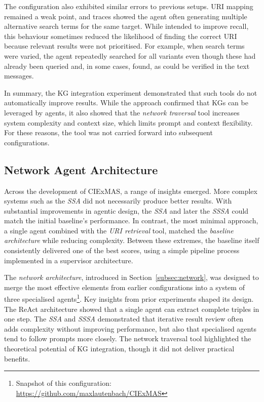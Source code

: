 \documentclass[a4paper,oneside,bibliography=totoc]{scrbook}
\begin{document}
The configuration also exhibited similar errors to previous setups. \ac{URI} mapping remained a weak point, and traces showed the agent often generating multiple alternative search terms for the same target. While intended to improve recall, this behaviour sometimes reduced the likelihood of finding the correct \ac{URI} because relevant results were not prioritised. For example, when search terms were varied, the agent repeatedly searched for all variants even though these had already been queried and, in some cases, found, as could be verified in the text messages.

In summary, the \ac{KG} integration experiment demonstrated that such tools do not automatically improve results. While the approach confirmed that \acp{KG} can be leveraged by agents, it also showed that the \textit{network traversal} tool increases system complexity and context size, which limits prompt and context flexibility. For these reasons, the tool was not carried forward into subsequent configurations.

\subsection{Network Agent Architecture}
\label{subsec:full_network_agent_architecture}

Across the development of CIExMAS, a range of insights emerged. More complex systems such as the \textit{\ac{SSA}} did not necessarily produce better results. With substantial improvements in agentic design, the \textit{\ac{SSA}} and later the \textit{\ac{SSSA}} could match the initial baseline’s performance. In contrast, the most minimal approach, a single agent combined with the \textit{\ac{URI} retrieval} tool, matched the \textit{baseline architecture} while reducing complexity. Between these extremes, the baseline itself consistently delivered one of the best scores, using a simple pipeline process implemented in a supervisor architecture.

The \textit{network architecture}, introduced in Section~\ref{subsec:network}, was designed to merge the most effective elements from earlier configurations into a system of three specialised agents\footnote{Snapshot of this configuration: \url{https://github.com/maxlautenbach/CIExMAS}}. Key insights from prior experiments shaped its design. The ReAct architecture showed that a single agent can extract complete triples in one step. The \textit{\ac{SSA}} and \textit{\ac{SSSA}} demonstrated that iterative result review often adds complexity without improving performance, but also that specialised agents tend to follow prompts more closely. The network traversal tool highlighted the theoretical potential of \ac{KG} integration, though it did not deliver practical benefits.
\end{document}

